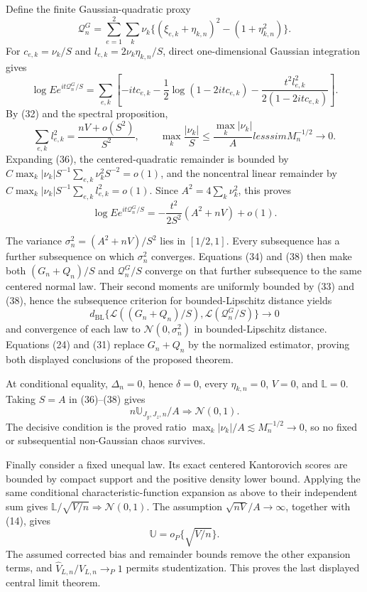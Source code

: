 Define the finite Gaussian-quadratic proxy
\[
\mathcal Q_n^G=\sum_{e=1}^2\sum_k\nu_k
\{(\xi_{e,k}+\eta_{k,n})^2-(1+\eta_{k,n}^2)\}.
\tag{35}
\]
For \(c_{e,k}=\nu_k/S\) and \(l_{e,k}=2\nu_k\eta_{k,n}/S\), direct one-dimensional Gaussian integration gives
\[
\log E e^{it\mathcal Q_n^G/S}
=\sum_{e,k}\left[-itc_{e,k}-\frac12\log(1-2itc_{e,k})
-\frac{t^2l_{e,k}^2}{2(1-2itc_{e,k})}\right].
\tag{36}
\]
By (32) and the spectral proposition,
\[
\sum_{e,k}l_{e,k}^2=\frac{nV+o(S^2)}{S^2},
\qquad
\max_k\frac{|\nu_k|}{S}\le\frac{\max_k|\nu_k|}{A}lesssim M_n^{-1/2}\to0.
\tag{37}
\]
Expanding (36), the centered-quadratic remainder is bounded by
\(C\max_k|\nu_k|S^{-1}\sum_{e,k}\nu_k^2S^{-2}=o(1)\), and the noncentral linear remainder by
\(C\max_k|\nu_k|S^{-1}\sum_{e,k}l_{e,k}^2=o(1)\).  Since \(A^2=4\sum_k\nu_k^2\), this proves
\[
\log E e^{it\mathcal Q_n^G/S}
=-\frac{t^2}{2S^2}(A^2+nV)+o(1).
\tag{38}
\]

The variance \(\sigma_n^2=(A^2+nV)/S^2\) lies in \([1/2,1]\).  Every subsequence has a further subsequence on which \(\sigma_n^2\) converges.  Equations (34) and (38) then make both \((G_n+Q_n)/S\) and \(\mathcal Q_n^G/S\) converge on that further subsequence to the same centered normal law.  Their second moments are uniformly bounded by (33) and (38), hence the subsequence criterion for bounded-Lipschitz distance yields
\[
d_{\mathrm{BL}}\{\mathcal L((G_n+Q_n)/S),\mathcal L(\mathcal Q_n^G/S)\}\to0
\]
and convergence of each law to \(\mathcal N(0,\sigma_n^2)\) in bounded-Lipschitz distance.  Equations (24) and (31) replace \(G_n+Q_n\) by the normalized estimator, proving both displayed conclusions of the proposed theorem.

At conditional equality, \(\Delta_n=0\), hence \(\delta=0\), every \(\eta_{k,n}=0\), \(V=0\), and \(\mathbb L=0\).  Taking \(S=A\) in (36)--(38) gives
\[
n\mathbb U_{J_y,J_z,n}/A\Rightarrow\mathcal N(0,1).
\]
The decisive condition is the proved ratio \(\max_k|\nu_k|/A\lesssim M_n^{-1/2}\to0\), so no fixed or subsequential non-Gaussian chaos survives.

Finally consider a fixed unequal law.  Its exact centered Kantorovich scores are bounded by compact support and the positive density lower bound.  Applying the same conditional characteristic-function expansion as above to their independent sum gives
\(\mathbb L/\sqrt{V/n}\Rightarrow\mathcal N(0,1)\).  The assumption \(\sqrt{nV}/A\to\infty\), together with (14), gives
\[
\mathbb U=o_P\{\sqrt{V/n}\}.
\]
The assumed corrected bias and remainder bounds remove the other expansion terms, and \(\widehat V_{L,n}/V_{L,n}\to_P1\) permits studentization.  This proves the last displayed central limit theorem.